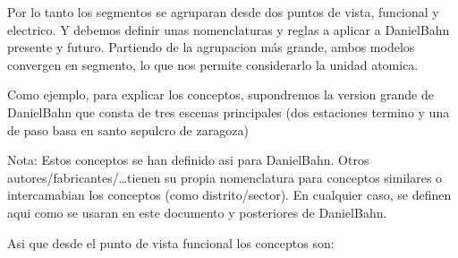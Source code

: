 Por lo tanto los segmentos se agruparan desde dos puntos de vista, funcional y electrico. Y debemos definir unas nomenclaturas y reglas a aplicar a DanielBahn presente y futuro. Partiendo de la agrupacion más grande, ambos modelos convergen en segmento, lo que nos permite considerarlo la unidad atomica. 

Como ejemplo, para explicar los conceptos,  supondremos la version grande de DanielBahn que consta de tres escenas principales (dos estaciones termino y una de paso basa en santo sepulcro de zaragoza)

Nota: Estos conceptos se han definido asi para DanielBahn. Otros autores/fabricantes/\dots tienen su propia nomenclatura para conceptos similares o intercamabian los conceptos (como distrito/sector). En cualquier caso, se definen aqui como se usaran en este documento y posteriores de DanielBahn.

Asi que desde el punto de vista funcional los conceptos son:

